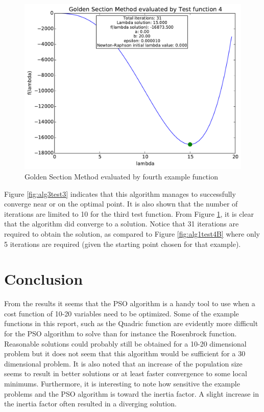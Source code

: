 \documentclass[a4paper,10pt]{article}
\begin{document}
\begin{figure}[h]
\centering
 \includegraphics[scale=0.55]{./graphs/algorithm3/testFunction4.pdf} 
 \caption{Golden Section Method evaluated by fourth example function}
 \label{fig:alg3test4}
\end{figure}

Figure \ref{fig:alg3test3} indicates that this algorithm manages to successfully converge near or on the optimal point. It is also shown that the number of iterations are limited to 10 for the third test function. From Figure \ref{fig:alg3test4}, it is clear that the algorithm did converge to a solution. Notice that 31 iterations are required to obtain the solution, as compared to Figure \ref{fig:alg1test4B} where only 5 iterations are required (given the starting point chosen for that example).

\newpage
\section{Conclusion}




From the results it seems that the PSO algorithm is a handy tool to use when a cost function of 10-20 variables need to be optimized. Some of the example functions in this report, such as the Quadric function are evidently more difficult for the PSO algorithm to solve than for instance the Rosenbrock function. Reasonable solutions could probably still be obtained for a 10-20 dimensional problem but it does not seem that this algorithm would be sufficient for a 30 dimensional problem. It is also noted that an increase of the population size seems to result in better solutions or at least faster convergence to some local minimums. Furthermore, it is interesting to note how sensitive the example problems and the PSO algorithm is toward the inertia factor. A slight increase in the inertia factor often resulted in a diverging solution.
\end{document}
